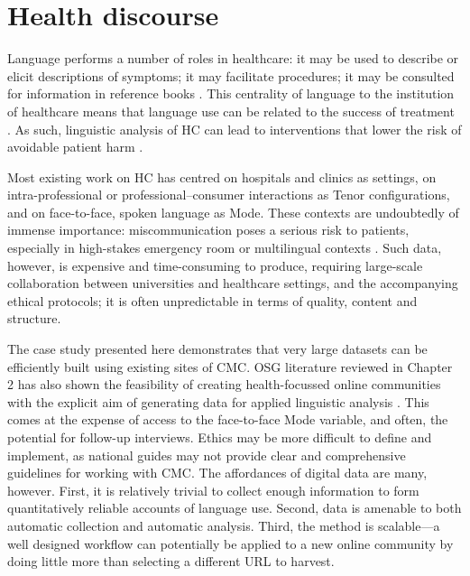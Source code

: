 \section{Health discourse}

Language performs a number of roles in healthcare: it may be used to describe or elicit descriptions of symptoms; it may facilitate procedures; it may be consulted for information in reference books \cite{matthiessen_applying_2013}. This centrality of language to the institution of healthcare means that language use can be related to the success of treatment \cite{divi_language_2007}. As such, linguistic analysis of \gls{HC} can lead to interventions that lower the risk of avoidable patient harm \cite{slade_communicating_2015}.

Most existing work on \gls{HC} has centred on hospitals and clinics as settings, on intra\hyp{}professional or professional--consumer interactions as Tenor configurations, and on face\hyp{}to\hyp{}face, spoken language as \gls{Mode}. These contexts are undoubtedly of immense importance: miscommunication poses a serious risk to patients, especially in high-stakes emergency room or multilingual contexts \cite{slade_role_2015,slade_effective_2015}. Such data, however, is expensive and time-consuming to produce, requiring large-scale collaboration between universities and healthcare settings, and the accompanying ethical protocols; it is often unpredictable in terms of quality, content and structure.

The case study presented here demonstrates that very large datasets can be efficiently built using existing sites of \gls{CMC}. OSG literature reviewed in Chapter 2 has also shown the feasibility of creating health-focussed online communities with the explicit aim of generating data for applied linguistic analysis \cite[e.g.][]{johnson_emergence_2015}. This comes at the expense of access to the face\hyp{}to\hyp{}face \gls{Mode} variable, and often, the potential for follow-up interviews. Ethics may be more difficult to define and implement, as national guides may not provide clear and comprehensive guidelines for working with \gls{CMC}. The affordances of digital data are many, however. First, it is relatively trivial to collect enough information to form quantitatively reliable accounts of language use. Second, data is amenable to both automatic collection and automatic analysis. Third, the method is scalable---a well designed workflow can potentially be applied to a new online community by doing little more than selecting a different URL to harvest.

